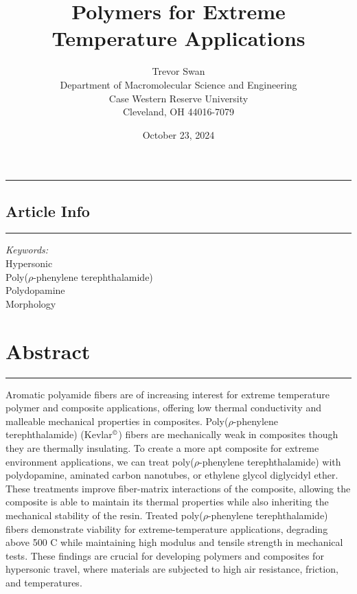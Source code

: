 \documentclass[12pt]{article}
\title{\textbf{Polymers for Extreme Temperature Applications}}
\author{Trevor Swan \\
Department of Macromolecular Science and Engineering \\ 
Case Western Reserve University \\
Cleveland, OH 44016-7079}
\date{October 23, 2024}
\begin{document}
\maketitle

\hrule height 1pt
\vspace{1em}

\noindent
\begin{minipage}[t]{0.2\textwidth}
    \subsection*{Article Info}
    \vspace{-0.5em}
    \hrule height 1pt
    \vspace{0.5em}
    \textit{Keywords:}\\
    	Hypersonic\\
        Poly($\rho$-phenylene terephthalamide)\\
        Polydopamine\\
    	Morphology
\end{minipage}%
\hfill
\begin{minipage}[t]{0.75\textwidth}
    \section*{Abstract}
    \vspace{-0.97em}
    \hrule height 1pt
    \vspace{0.5em}
    Aromatic polyamide fibers are of increasing interest for extreme temperature polymer and composite applications, offering  low thermal conductivity and malleable mechanical properties in composites. Poly($\rho$-phenylene terephthalamide) (Kevlar$^{\text{\textcopyright}}$) fibers are mechanically weak in composites though they are thermally insulating. To create a more apt composite for extreme environment applications, we can treat poly($\rho$-phenylene terephthalamide) with polydopamine, aminated carbon nanotubes, or ethylene glycol diglycidyl ether. These treatments improve fiber-matrix interactions of the composite, allowing the composite is able to maintain its thermal properties while also inheriting the mechanical stability of the resin. Treated poly($\rho$-phenylene terephthalamide) fibers demonstrate viability for extreme-temperature applications, degrading above 500 \degree C while maintaining high modulus and tensile strength in mechanical tests. These findings are crucial for developing polymers and composites for hypersonic travel, where materials are subjected to high air resistance, friction, and temperatures.
    
\end{minipage}
\end{document}
